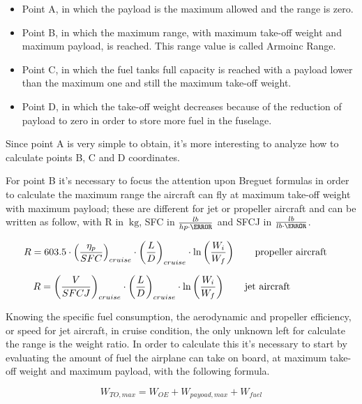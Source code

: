 \begin{itemize}
\item Point A, in which the payload is the maximum allowed and the range is zero.
\item Point B, in which the maximum range, with maximum take-off weight and maximum payload, is reached. This range value is called Armoinc Range.
\item Point C, in which the fuel tanks full capacity is reached with a payload lower than the maximum one and still the maximum take-off weight.
\item Point D, in which the take-off weight decreases because of the reduction of payload to zero in order to store more fuel in the fuselage.
\end{itemize}

Since point A is very simple to obtain, it’s more interesting to analyze how to calculate points B, C and D coordinates.

For point B it’s necessary to focus the attention upon Breguet formulas in order to calculate the maximum range the aircraft can fly at maximum take-off weight with maximum payload; these are different for jet or propeller aircraft and can be written as follow, with R in $\SI{}{\kilogram}$, SFC in $\frac{lb}{hp\cdot\hour}$ and SFCJ in $\frac{lb}{lb\cdot\hour}$.

\begin{eqnarray}
R=603.5\cdot \left(\frac{\eta_{p}}{SFC}\right)_{cruise}\cdot \left(\frac{L}{D}\right)_{cruise}\cdot \ln\left(\frac{W_{i}}{W_{f}}\right) %
\qquad \textrm {\parbox[t][][t]{.25\linewidth } {\raggedright propeller aircraft}}
\label{eqn:Equation1.1}
\end{eqnarray}

\begin{eqnarray}
R=\left(\frac{V}{SFCJ}\right)_{cruise}\cdot \left(\frac{L}{D}\right)_{cruise}\cdot \ln\left(\frac{W_{i}}{W_{f}}\right) %
\qquad \textrm {\parbox[t][][t]{.25\linewidth} {jet aircraft}}
\label{eqn:Equation1.2}
\end{eqnarray}

\bigskip
Knowing the specific fuel consumption, the aerodynamic and propeller efficiency, or speed for jet aircraft, in cruise condition, the only unknown left for calculate the range is the weight ratio. In order to calculate this it’s necessary to start by evaluating the amount of fuel the airplane can take on board, at maximum take-off weight and maximum payload, with the following formula.

\begin{equation}
W_{TO,max}=W_{OE}+W_{payoad,max}+W_{fuel}
\label{eqn:Equation1.3}
\end{equation}

